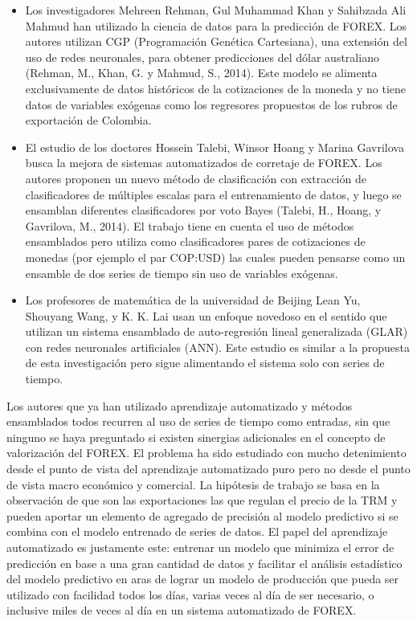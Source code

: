 \begin{spacing}{1.5}
\begin{itemize}
\item Los investigadores Mehreen Rehman, Gul Muhammad Khan y Sahibzada Ali Mahmud han utilizado la ciencia de datos para la predicción de FOREX. Los autores utilizan CGP (Programación Genética Cartesiana), una extensión del uso de redes neuronales, para obtener predicciones del dólar australiano (Rehman, M., Khan, G. y Mahmud, S., 2014). Este modelo se alimenta exclusivamente de datos históricos de la cotizaciones de la moneda y no tiene datos de variables exógenas como los regresores propuestos de los rubros de exportación de Colombia. 
\item El estudio de los doctores Hossein Talebi, Winsor Hoang y Marina Gavrilova busca la mejora de sistemas automatizados de corretaje de FOREX. Los autores proponen un nuevo método de clasificación con extracción de clasificadores de múltiples escalas para el entrenamiento de datos, y luego se ensamblan diferentes clasificadores por voto Bayes (Talebi, H., Hoang, y Gavrilova, M., 2014). El trabajo tiene en cuenta el uso de métodos ensamblados pero utiliza como clasificadores pares de cotizaciones de monedas (por ejemplo el par COP:USD) las cuales pueden pensarse como un ensamble de dos series de tiempo sin uso de variables exógenas. 
\item Los profesores de matemática de la universidad de Beijing Lean Yu, Shouyang Wang, y K. K. Lai usan un enfoque novedoso en el sentido que utilizan un sistema ensamblado de auto-regresión lineal generalizada (GLAR) con redes neuronales artificiales (ANN). Este estudio es similar a la propuesta de esta investigación pero sigue alimentando el sistema solo con series de tiempo.  
\end{itemize}

Los autores que ya han utilizado aprendizaje automatizado y métodos ensamblados todos recurren al uso de series de tiempo como entradas, sin que ninguno se haya preguntado si existen sinergias adicionales en el concepto de valorización del FOREX. El problema ha sido estudiado con mucho detenimiento desde el punto de vista del aprendizaje automatizado puro pero no desde el punto de vista macro económico y comercial. La hipótesis de trabajo se basa en la observación de que son las exportaciones las que regulan el precio de la TRM y pueden aportar un elemento de agregado de precisión al modelo predictivo si se combina con el modelo entrenado de series de datos. El papel del aprendizaje automatizado es justamente este: entrenar un modelo que minimiza el error de predicción en base a una gran cantidad de datos y facilitar el análisis estadístico del modelo predictivo en aras de lograr un modelo de producción que pueda ser utilizado con facilidad todos los días, varias veces al día de ser necesario, o inclusive miles de veces al día en un sistema automatizado de FOREX. 
\end{spacing}
